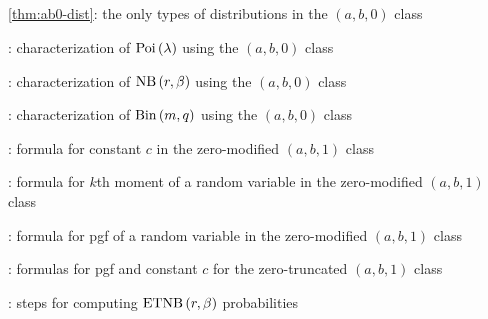 \subsection*{}
\item \cref{thm:ab0-dist}: the only types of distributions in the \((a,b,0)\) class
\item {}: characterization of \(\operatorname{Poi}\left(\lambda\right)\) using the \((a,b,0)\) class
\item {}: characterization of \(\operatorname{NB}\left(r,\beta\right)\) using the \((a,b,0)\) class
\item {}: characterization of \(\operatorname{Bin}\left(m,q\right)\) using the \((a,b,0)\) class
\item {}: formula for constant \(c\) in the zero-modified \((a,b,1)\) class
\item {}: formula for \(k\)th moment of a random variable in the zero-modified \((a,b,1)\) class
\item {}: formula for pgf of a random variable in the zero-modified \((a,b,1)\) class
\item {}: formulas for pgf and constant \(c\) for the
zero-truncated \((a,b,1)\) class
\item {}: steps for computing \(\operatorname{ETNB}\left(r,\beta\right)\) probabilities

